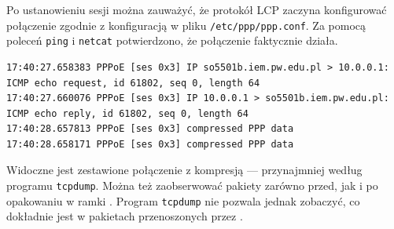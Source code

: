 Po ustanowieniu sesji można zauważyć, że protokół LCP zaczyna konfigurować
połączenie \tcp{} zgodnie z konfiguracją w pliku \texttt{/etc/ppp/ppp.conf}.
Za pomocą poleceń \texttt{ping} i \texttt{netcat} potwierdzono, że połączenie
faktycznie działa.

\begin{lstlisting}
17:40:27.658383 PPPoE [ses 0x3] IP so5501b.iem.pw.edu.pl > 10.0.0.1: ICMP echo request, id 61802, seq 0, length 64
17:40:27.660076 PPPoE [ses 0x3] IP 10.0.0.1 > so5501b.iem.pw.edu.pl: ICMP echo reply, id 61802, seq 0, length 64
17:40:28.657813 PPPoE [ses 0x3] compressed PPP data
17:40:28.658171 PPPoE [ses 0x3] compressed PPP data
\end{lstlisting}

Widoczne jest zestawione połączenie z kompresją --- przynajmniej według
programu \texttt{tcpdump}. Można też zaobserwować pakiety zarówno przed, jak i
po opakowaniu w ramki \ppp{}. Program \texttt{tcpdump} nie pozwala jednak
zobaczyć, co dokładnie jest w pakietach przenoszonych przez \ppp.
